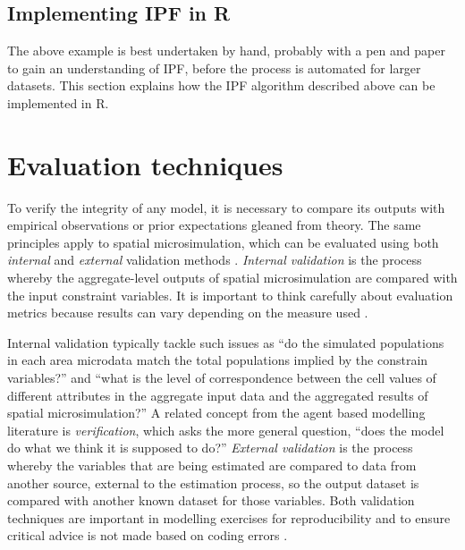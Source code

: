 \documentclass[a4paper,10pt]{article}
\begin{document}
\subsection{Implementing IPF in R} \label{simplementing}
The above example is best undertaken by hand, probably with a pen and paper
to gain an understanding of IPF, before the process is automated for 
larger datasets. This section explains how the IPF
algorithm described above can be implemented in R.


\section{Evaluation techniques}
To verify the integrity of any model, it is necessary to compare its outputs
with empirical observations or prior expectations gleaned from theory.
The same principles apply to spatial microsimulation, which can be evaluated using
both \emph{internal} and \emph{external} validation methods \citep{Edwards2009}.
\emph{Internal validation} is the process whereby
the aggregate-level outputs of spatial microsimulation are compared with
the input constraint variables. It is important to think carefully about
evaluation metrics because results can vary depending on the measure used
\citep{Voas2001}.

Internal validation typically tackle such issues
as ``do the simulated populations in each area
microdata match the total populations implied by the constrain variables?''
and ``what is the level of correspondence between the cell values of different
attributes in the aggregate input data and the aggregated results of spatial microsimulation?''
A related concept from the agent based modelling literature is
\emph{verification}, which asks the more general question,
``does the model
do what we think it is supposed to do?'' \citep[p.~131]{ormerod2009validation} 
\emph{External validation} is the process whereby the variables that are
being estimated are compared to data from another source,
external to the estimation process, so the output dataset is compared with
another known dataset for those variables.
Both validation techniques are important in modelling exercises for reproducibility and to ensure critical advice is not made
based on coding errors \citep{ormerod2009validation}.
\end{document}
